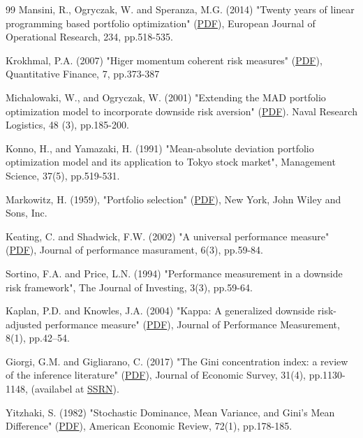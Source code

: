 \begin{thebibliography}{99}
 Mansini, R., Ogryczak, W. and Speranza, M.G. (2014) "Twenty years of linear programming based portfolio optimization"
(\href{http://staff.elka.pw.edu.pl/~wogrycza/publikacje/artykuly/ejor20y.pdf}{PDF}), European Journal of Operational Research, 234, pp.518-535.

 Krokhmal, P.A. (2007) "Higer momentum coherent risk measures"
(\href{http://u.arizona.edu/~krokhmal/pdf/hmcr-qf.pdf}{PDF}), Quantitative Finance, 7, pp.373-387

 Michalowaki, W., and Ogryczak, W. (2001) "Extending the MAD portfolio optimization model to incorporate downside risk aversion"
(\href{https://www.researchgate.net/publication/227653131_Extending_the_MAD_portfolio_optimization_model_to_incorporate_downside_risk_aversion}{PDF}).
Naval Research Logistics, 48 (3), pp.185-200.

 Konno, H., and Yamazaki, H. (1991) "Mean-absolute deviation portfolio optimization model and its application
to Tokyo stock market", Management Science, 37(5), pp.519-531.

 Markowitz, H. (1959), "Portfolio selection"
(\href{https://cowles.yale.edu/sites/default/files/files/pub/mon/m16-all.pdf}{PDF}),  New York, John Wiley and Sons, Inc.

 Keating, C. and Shadwick, F.W. (2002) "A universal performance measure"
(\href{https://www.actuaries.org.uk/system/files/documents/pdf/keating.pdf}{PDF}),
Journal of performance masurament, 6(3), pp.59-84.

 Sortino, F.A. and Price, L.N. (1994) "Performance measurement in a downside risk framework",
The Journal of Investing, 3(3), pp.59-64.

 Kaplan, P.D. and  Knowles, J.A. (2004) "Kappa: A generalized downside risk-adjusted performance measure"
(\href{http://ww.performance-measurement.org/KaplanKnowles2004.pdf}{PDF}),
Journal of Performance Measurement, 8(1), pp.42–54.

 Giorgi, G.M. and Gigliarano, C. (2017) "The Gini concentration index: a review of the inference literature"
(\href{https://papers.ssrn.com/sol3/papers.cfm?abstract_id=3016694}{PDF}),
Journal of Economic Survey, 31(4), pp.1130-1148, (availabel at \href{https://papers.ssrn.com/sol3/papers.cfm?abstract_id=3016694}{SSRN}).

 Yitzhaki, S. (1982) "Stochastic Dominance, Mean Variance, and Gini's Mean Difference"
(\href{https://www.researchgate.net/publication/4900733_Stochastic_Dominance_Mean_Variance_and_Gini's_Mean_Difference}{PDF}),
American Economic Review, 72(1), pp.178-185.


\end{thebibliography}

